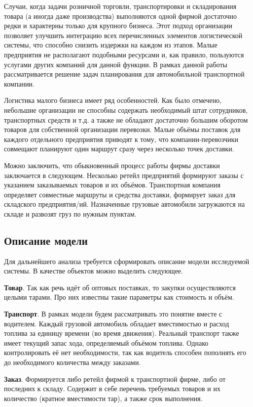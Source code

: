 Случаи, когда задачи розничной торговли, транспортировки и складирования товара (а иногда даже производства) выполняются одной фирмой достаточно редки и характерны только для крупного бизнеса. Этот подход организации позволяет улучшить интеграцию всех перечисленных элементов логистической системы, что способно снизить издержки на каждом из этапов. Малые предприятия не располагают подобными ресурсами и, как правило, пользуются услугами других компаний для данной функции. В рамках данной работы рассматривается решение задач планирования для автомобильной транспортной компании.

Логистика малого бизнеса имеет ряд особенностей\cite{subj:small_business}. Как было отмечено, небольшие организации не способны содержать необходимый штат сотрудников, транспортных средств и т.д. а также не обладают достаточно большим оборотом товаров для собственной организации перевозки. Малые объёмы поставок для каждого отдельного предприятия приводят к тому, что компании-перевозчики совмещают планируют один маршрут сразу через несколько точек доставки.

Можно заключить, что обыкновенный процесс работы фирмы доставки заключается в следующем. Несколько ретейл предприятий формируют заказы с указанием заказываемых товаров и их объёмов. Транспортная компания определяет совместные маршруты и средства доставки, формирует заказ для складского предприятия/ий. Назначенные грузовые автомобили загружаются на складе и развозят груз по нужным пунктам.

\subsection{Описание модели}
Для дальнейшего анализа требуется сформировать описание модели исследуемой системы. В качестве объектов можно выделить следующее.

\textbf{Товар}. Так как речь идёт об оптовых поставках, то закупки осуществляются целыми тарами. Про них известны такие параметры как стоимость и объём.

\textbf{Транспорт}. В рамках модели будем рассматривать это понятие вместе с водителем. Каждый грузовой автомобиль обладает вместимостью и расход топлива за единицу времени (во время движения). Реальный транспорт также имеет текущий запас хода, определяемый объёмом топлива. Однако контролировать её нет необходимости, так как водитель способен пополнять его до необходимого количества между заказами.

\textbf{Заказ}. Формируется либо ретейл фирмой к транспортной фирме, либо от последних к складу. Содержит в себе перечень требуемых товаров и их количество (кратное вместимости тар), а также срок выполнения.

